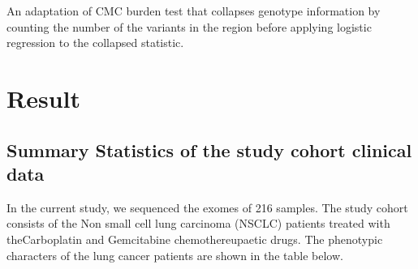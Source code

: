 An adaptation of CMC burden test that collapses genotype information by counting the number of the variants in the region before applying logistic regression to the collapsed statistic.

 
 
 
 
 
 
 
 
 
 
 \chapter{Result}
\label{chapter: result}

\section{Summary Statistics of the study cohort clinical data}

In the current study, we sequenced the exomes of 216 samples. The study cohort consists of the Non small cell lung carcinoma (NSCLC) patients treated with theCarboplatin and Gemcitabine  chemothereupaetic drugs. The phenotypic characters of the lung cancer patients are shown in the table below. 

